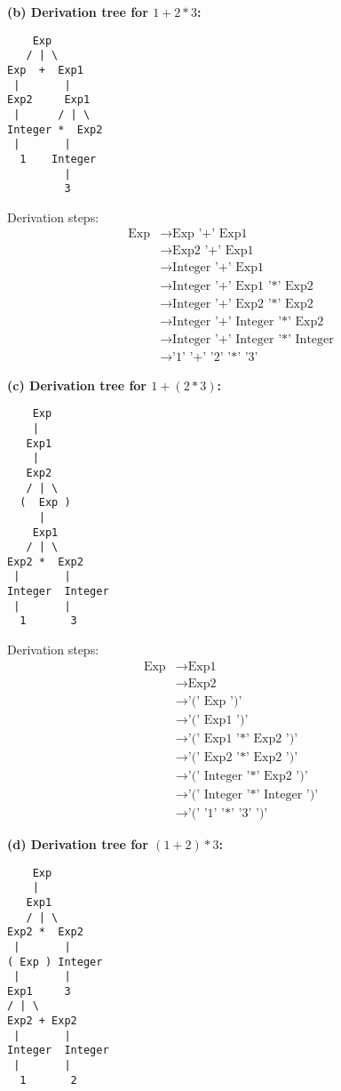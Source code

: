 \documentclass[12pt]{article}
\begin{document}
\textbf{(b) Derivation tree for $1+2*3$:}

\begin{verbatim}
    Exp
   / | \
Exp  +  Exp1
 |       |
Exp2     Exp1
 |      / | \
Integer *  Exp2
 |       |
  1    Integer
         |
         3
\end{verbatim}

Derivation steps:
\begin{align}
\text{Exp} &\to \text{Exp '+' Exp1} \\
&\to \text{Exp2 '+' Exp1} \\
&\to \text{Integer '+' Exp1} \\
&\to \text{Integer '+' Exp1 '*' Exp2} \\
&\to \text{Integer '+' Exp2 '*' Exp2} \\
&\to \text{Integer '+' Integer '*' Exp2} \\
&\to \text{Integer '+' Integer '*' Integer} \\
&\to \text{'1' '+' '2' '*' '3'}
\end{align}

\textbf{(c) Derivation tree for $1+(2*3)$:}

\begin{verbatim}
    Exp
    |
   Exp1
    |
   Exp2
   / | \
  (  Exp )
     |
    Exp1
   / | \
Exp2 *  Exp2
 |       |
Integer  Integer
 |       |
  1       3
\end{verbatim}

Derivation steps:
\begin{align}
\text{Exp} &\to \text{Exp1} \\
&\to \text{Exp2} \\
&\to \text{'(' Exp ')'} \\
&\to \text{'(' Exp1 ')'} \\
&\to \text{'(' Exp1 '*' Exp2 ')'} \\
&\to \text{'(' Exp2 '*' Exp2 ')'} \\
&\to \text{'(' Integer '*' Exp2 ')'} \\
&\to \text{'(' Integer '*' Integer ')'} \\
&\to \text{'(' '1' '*' '3' ')'}
\end{align}

\textbf{(d) Derivation tree for $(1+2)*3$:}

\begin{verbatim}
    Exp
    |
   Exp1
   / | \
Exp2 *  Exp2
 |       |
( Exp ) Integer
 |       |
Exp1     3
/ | \
Exp2 + Exp2
 |       |
Integer  Integer
 |       |
  1       2
\end{verbatim}
\end{document}
